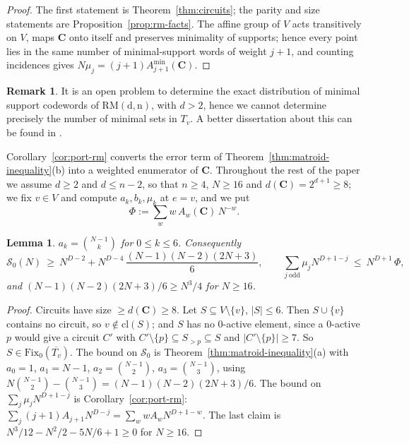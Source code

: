 \documentclass[11pt,a4paper]{article}
\newtheorem{lemma}[theorem]{Lemma}
\theoremstyle{definition}
\newtheorem{remark}[theorem]{Remark}
\newcommand{\Fix}{\mathrm{Fix}}
\newcommand{\cl}{\mathrm{cl}}
\begin{document}
\begin{proof}
The first statement is Theorem~\ref{thm:circuits}; the parity and size statements are Proposition~\ref{prop:rm-facts}. The affine group of $V$ acts transitively on $V$, maps $\mathbf{C}$ onto itself and preserves minimality of supports; hence every point lies in the same number of minimal-support words of weight $j+1$, and counting incidences gives $N\mu_j=(j+1)A^{\min}_{j+1}(\mathbf{C})$.
\end{proof}


\begin{remark}
    It is an open problem to determine the exact distribution of minimal support codewords of $\mathrm{RM(d,n)}$, with $d > 2$, hence we cannot determine precisely the number of minimal sets in $T_v$.
    A better dissertation about this can be found in \cite{minimal}.
\end{remark}

\medskip\noindent
Corollary~\ref{cor:port-rm} converts the error term of
Theorem~\ref{thm:matroid-inequality}(b) into a weighted enumerator of $\mathbf C$.
Throughout the rest of the paper we assume $d\ge2$ and $d\le n-2$, so that $n\ge4$,
$N\ge16$ and $d(\mathbf{C})=2^{d+1}\ge8$; we fix $v\in V$ and compute
$a_k,b_k,\mu_k$ at $e=v$, and we put
\[
\Phi:=\sum_{w}w\,A_w(\mathbf{C})\,N^{-w}.
\]

\begin{lemma}\label{lem:small}
$a_k=\binom{N-1}k$ for $0\le k\le6$. Consequently
\[
\mathcal S_0(N)\ \ge\ N^{D-2}+N^{D-4}\,\frac{(N-1)(N-2)(2N+3)}{6},
\qquad
\sum_{j\ \mathrm{odd}}\mu_jN^{D+1-j}\ \le\ N^{D+1}\,\Phi ,
\]
and $(N-1)(N-2)(2N+3)/6\ge N^3/4$ for $N\ge16$.
\end{lemma}

\begin{proof}
Circuits have size $\ge d(\mathbf{C})\ge8$. Let $S\subseteq V\setminus\{v\}$, $|S|\le6$. Then $S\cup\{v\}$ contains no circuit, so $v\notin\cl(S)$; and $S$ has no $0$-active element, since a $0$-active $p$ would give a circuit $C'$ with $C'\setminus\{p\}\subseteq S_{>p}\subseteq S$ and $|C'\setminus\{p\}|\ge7$. So $S\in\Fix_0(\overline{T_v})$. The bound on $\mathcal S_0$ is Theorem~\ref{thm:matroid-inequality}(a) with $a_0=1$, $a_1=N-1$, $a_2=\binom{N-1}2$, $a_3=\binom{N-1}3$, using $N\binom{N-1}2-\binom{N-1}3=(N-1)(N-2)(2N+3)/6$. The bound on $\sum_j\mu_jN^{D+1-j}$ is Corollary~\ref{cor:port-rm}: $\sum_{j}(j+1)A_{j+1}N^{D-j}=\sum_ww A_wN^{D+1-w}$. The last claim is $N^3/12-N^2/2-5N/6+1\ge0$ for $N\ge16$.
\end{proof}
\end{document}
